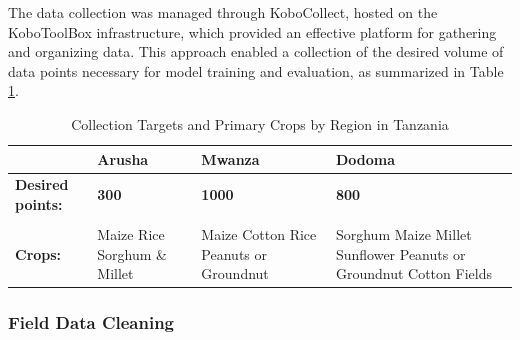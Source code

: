 \documentclass[
  journal,
  twocolumn]{IEEEtran}
\begin{document}
The data collection was managed through KoboCollect, hosted on the
KoboToolBox infrastructure, which provided an effective platform for
gathering and organizing data. This approach enabled a collection of the
desired volume of data points necessary for model training and
evaluation, as summarized in Table \ref{tab:data_n}.

\onecolumn 
\begin{table}[h!]
\centering
\begin{tabular}{@{}lp{4cm}p{4cm}p{4cm}@{}}
\toprule
& \textbf{Arusha} & \textbf{Mwanza} & \textbf{Dodoma} \\ \midrule
\textbf{Desired points:} & \textbf{300} & \textbf{1000} & \textbf{800} \\ 
\midrule \\
\textbf{Crops:} & Maize \newline Rice \newline Sorghum \& Millet 
               & Maize \newline Cotton \newline Rice \newline Peanuts or Groundnut 
               & Sorghum \newline Maize \newline Millet \newline Sunflower \newline Peanuts or Groundnut \newline Cotton Fields \\ 
\bottomrule
\end{tabular}
\caption{Collection Targets and Primary Crops by Region in Tanzania}
\label{tab:data_n}
\end{table}
\twocolumn

\hypertarget{field-data-cleaning}{%
\subsubsection{Field Data Cleaning}\label{field-data-cleaning}}
\end{document}
